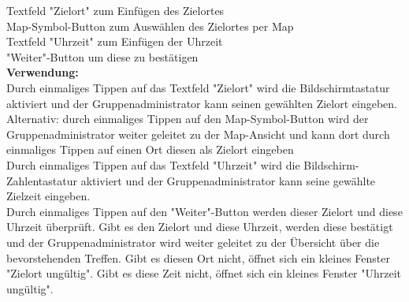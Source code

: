 Textfeld "Zielort" zum Einfügen des Zielortes\\
Map-Symbol-Button zum Auswählen des Zielortes per Map\\
Textfeld "Uhrzeit" zum Einfügen der Uhrzeit\\
"Weiter"-Button um diese zu bestätigen\\
\textbf{Verwendung:}\\
Durch einmaliges Tippen auf das Textfeld "Zielort" wird die Bildschirmtastatur aktiviert und der Gruppenadministrator kann seinen gewählten Zielort eingeben.\\
Alternativ: durch einmaliges Tippen auf den Map-Symbol-Button wird der Gruppenadministrator weiter geleitet zu der Map-Ansicht und kann dort durch einmaliges Tippen auf einen Ort diesen als Zielort eingeben\\
Durch einmaliges Tippen auf das Textfeld "Uhrzeit" wird die Bildschirm-Zahlentastatur aktiviert und der Gruppenadministrator kann seine gewählte Zielzeit eingeben.\\
Durch einmaliges Tippen auf den "Weiter"-Button werden dieser Zielort und diese Uhrzeit überprüft. Gibt es den Zielort und diese Uhrzeit, werden diese bestätigt und der Gruppenadministrator wird weiter geleitet zu der Übersicht über die bevorstehenden Treffen. Gibt es diesen Ort nicht, öffnet sich ein kleines Fenster "Zielort ungültig". Gibt es diese Zeit nicht, öffnet sich ein kleines Fenster "Uhrzeit ungültig".\\ \\

